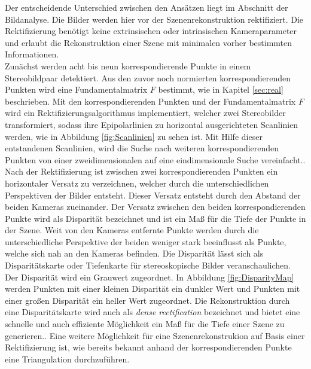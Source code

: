 Der entscheidende Unterschied zwischen den Ansätzen liegt im Abschnitt der Bildanalyse. Die Bilder werden hier vor der Szenenrekonstruktion rektifiziert. Die Rektifizierung benötigt keine extrinsischen oder intrinsischen Kameraparameter und erlaubt die Rekonstruktion einer Szene mit minimalen vorher bestimmten Informationen\cite{ZZ,Javier,Fusiello,phdextrinsicPara}.\\

%

Zunächst werden acht bis neun korrespondierende Punkte in einem Stereobildpaar detektiert. Aus den zuvor noch normierten korrespondierenden Punkten wird eine Fundamentalmatrix $F$ bestimmt, wie in Kapitel \ref{sec:real} beschrieben. Mit den korrespondierenden Punkten und der Fundamentalmatrix $F$ wird ein Rektifizierungsalgorithmus implementiert, welcher zwei Stereobilder transformiert, sodass ihre Epipolarlinien zu horizontal ausgerichteten Scanlinien werden, wie in Abbildung \ref{fig:Scanlinien} zu sehen ist. Mit Hilfe dieser entstandenen Scanlinien, wird die Suche nach weiteren korrespondierenden Punkten von einer zweidimensionalen auf eine eindimensionale Suche vereinfacht.\cite{ZZ,Fusiello,Javier}.\\

Nach der Rektifizierung ist zwischen zwei korrespondierenden Punkten ein horizontaler Versatz zu verzeichnen, welcher durch die unterschiedlichen Perspektiven der Bilder entsteht. Dieser Versatz entsteht durch den Abstand der beiden Kameras zueinander. Der Versatz zwischen den beiden korrespondierenden Punkte wird als Disparität bezeichnet und ist ein Maß für die Tiefe der Punkte in der Szene\cite{Javier,Fusiello}. Weit von den Kameras entfernte Punkte werden durch die unterschiedliche Perspektive der beiden weniger stark beeinflusst als Punkte, welche sich nah an den Kameras befinden. Die Disparität lässt sich als Disparitätskarte oder Tiefenkarte für stereoskopische Bilder veranschaulichen\cite{Javier}. Der Disparität wird ein Grauwert zugeordnet. In Abbildung \ref{fig:DisparityMap} werden Punkten mit einer kleinen Disparität ein dunkler Wert und Punkten mit einer großen Disparität ein heller Wert zugeordnet. Die Rekonstruktion durch eine Disparitätskarte wird auch als \textit{dense rectification} bezeichnet und bietet eine schnelle und auch effiziente Möglichkeit ein Maß für die Tiefe einer Szene zu generieren.\cite{Javier,Fusiello,ZZ}. Eine weitere Möglichkeit für eine Szenenrekonstrukion auf Basis einer Rektifizierung ist, wie bereits bekannt anhand der korrespondierenden Punkte eine Triangulation durchzuführen\cite{Javier}.\\

